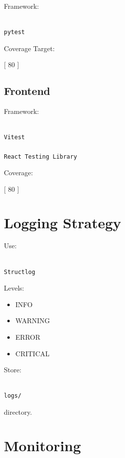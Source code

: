 \documentclass[11pt,a4paper]{article}
\begin{document}
Framework:

\begin{verbatim}

pytest

\end{verbatim}

Coverage Target:

[
80%
]

\subsection{Frontend}

Framework:

\begin{verbatim}

Vitest

React Testing Library

\end{verbatim}

Coverage:

[
80%
]

\section{Logging Strategy}

Use:

\begin{verbatim}

Structlog

\end{verbatim}

Levels:

\begin{itemize}
\item INFO
\item WARNING
\item ERROR
\item CRITICAL
\end{itemize}

Store:

\begin{verbatim}

logs/

\end{verbatim}

directory.

\section{Monitoring}
\end{document}
